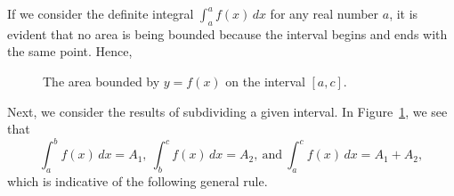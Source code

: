 If we consider the definite integral $\int_a^a f(x) \, dx$ for any real number $a$, it is evident that no area is being bounded because the interval begins and ends with the same point.  Hence, 

\vspace*{5pt}
\nin {}
\vspace*{1pt}
 
\begin{figure}[h]
\begin{center}
\caption{The area bounded by $y=f(x)$ on the interval $[a,c]$.} \label{F:4.3.AdditiveProp}
\end{center}
\end{figure}

Next, we consider the results of subdividing a given interval. In Figure~\ref{F:4.3.AdditiveProp}, we see that
$$\int_a^b f(x) \, dx = A_1, \ \int_b^c f(x) \, dx = A_2, \ \mbox{and} \ \int_a^c f(x) \, dx = A_1 + A_2,$$ 
which is indicative of the following general rule.
  
\vspace*{5pt}
\nin {}
\vspace*{1pt}

